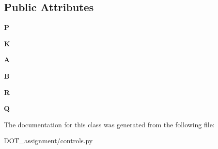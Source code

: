 \subsection*{Public Attributes}
\begin{DoxyCompactItemize}
\item 
\mbox{\label{class_d_o_t__assignment_1_1controls_1_1_linear_feedback_aaba268ee8fdabbcecec4fc94265c3e9f}} 
{\bfseries P}
\item 
\mbox{\label{class_d_o_t__assignment_1_1controls_1_1_linear_feedback_a3b9b84465ba09ad63b99b8aa156a983e}} 
{\bfseries K}
\item 
\mbox{\label{class_d_o_t__assignment_1_1controls_1_1_linear_feedback_a15fb0a6e6ac6330588431aee078c674c}} 
{\bfseries A}
\item 
\mbox{\label{class_d_o_t__assignment_1_1controls_1_1_linear_feedback_a57d6df28281b5370ea1d2c3470897122}} 
{\bfseries B}
\item 
\mbox{\label{class_d_o_t__assignment_1_1controls_1_1_linear_feedback_aac7293446004ffa92d80376fe5158150}} 
{\bfseries R}
\item 
\mbox{\label{class_d_o_t__assignment_1_1controls_1_1_linear_feedback_a4fcf3718126e63aa6a4bd1c1824a1580}} 
{\bfseries Q}
\end{DoxyCompactItemize}


The documentation for this class was generated from the following file\+:\begin{DoxyCompactItemize}
\item 
D\+O\+T\+\_\+assignment/controls.\+py\end{DoxyCompactItemize}

